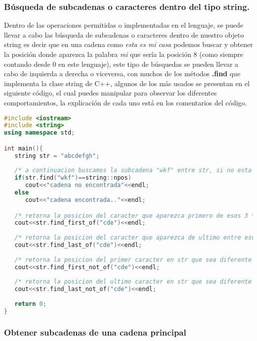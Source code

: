 \subsubsection{Búsqueda de subcadenas o caracteres dentro del tipo string.}

Dentro de las operaciones permitidas o implementadas en el lenguaje, se puede llevar a cabo las búsqueda de subcadenas o caracteres dentro de nuestro objeto string es decir que en una cadena como \emph{esta es mi casa} podemos buscar y obtener la posición donde aparezca la palabra \emph{mi} que sería la posición 8 (como siempre contando desde 0 en este lenguaje), este tipo de búsquedas se pueden llevar a cabo de izquierda a derecha o viceversa, con muchos de los métodos \textbf{.find} que implementa la clase string de C++, algunos de los más usados se presentan en el siguiente código, el cual puedes manipular para observar los diferentes comportamientos, la explicación de cada uno está en los comentarios del código.

\begin{lstlisting}[language=C++]
#include <iostream>
#include <string>
using namespace std;

int main(){
   string str = "abcdefgh";
	
   /* a continuacion buscamos la subcadena "wkf" entre str, si no esta presente, retorna la constante npos que es equivalente a NULL en el tipo string, en este codigo se mostrara que la cadena no fue encontrada el metodo find() nos retorna la prosicion del primer caracter del arguento que aparece en la cadena str.*/
   if(str.find("wkf")==string::npos)
      cout<<"cadena no encontrada"<<endl;
   else
      cout<<"cadena encontrada.."<<endl;

   /* retorna la posicion del caracter que aparezca primero de esos 3 */
   cout<<str.find_first_of("cde")<<endl; 
	
   /* retorna la posicion del caracter que aparezca de ultimo entre esos 3 */
   cout<<str.find_last_of("cde")<<endl; 
   
   /* retorna la posicion del primer caracter en str que sea diferente a todos los del argumento	*/
   cout<<str.find_first_not_of("cde")<<endl;
   
   /* retorna la posicion del ultimo caracter en str que sea diferente de todos los del argumento */	
   cout<<str.find_last_not_of("cde")<<endl; 
	
   return 0;
}
\end{lstlisting}

\subsubsection{Obtener subcadenas de una cadena principal}

